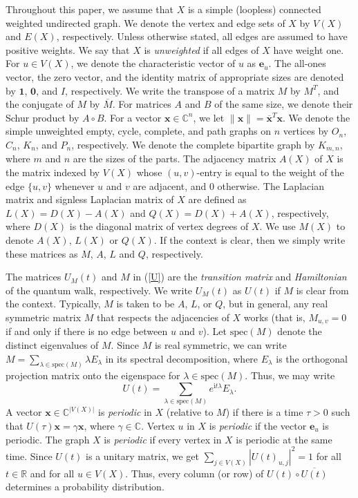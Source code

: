 \documentclass[11pt]{article}
\newcommand{\be}{\mathbf e}
\newcommand{\bx}{\mathbf x}
\newcommand{\one}{\mathbf 1}
\newcommand{\zero}{\mathbf 0}
\def\ii{\mathrm{i}}
\newcommand\spec{{\mathrm{spec}}}
\def\C{\mathbb{C}}
\def\R{\mathbb{R}}
\begin{document}
Throughout this paper, we assume that $X$ is a simple (loopless) connected weighted undirected graph. We denote the vertex and edge sets of $X$ by $V(X)$ and $E(X)$, respectively. Unless otherwise stated, all edges are assumed to have positive weights. We say that $X$ is \textit{unweighted} if all edges of $X$ have weight one. For $u\in V(X)$, we denote the characteristic vector of $u$ as $\be_u$. The all-ones vector, the zero vector, and the identity matrix of appropriate sizes are denoted by $\one$, $\zero$, and $I$, respectively. We write the transpose of a matrix $M$ by $M^T$, and the conjugate of $M$ by $\overline{M}$. For matrices $A$ and $B$ of the same size, we denote their Schur product by $A\circ B$. For a vector $\bx\in\C^n$, we let $\|\bx\|=\overline{\bx}^T\bx$. We denote the simple unweighted empty, cycle, complete, and path graphs on $n$ vertices by $O_n$, $C_n$, $K_n$, and $P_n$, respectively. We denote the complete bipartite graph by $K_{m,n}$, where $m$ and $n$ are the sizes of the parts. The adjacency matrix $A(X)$ of $X$ is the matrix indexed by $V(X)$ whose $(u,v)$-entry is equal to the weight of the edge $\{u,v\}$ whenever $u$ and $v$ are adjacent, and 0 otherwise. The Laplacian matrix  and signless Laplacian matrix of $X$ are defined as $L(X)=D(X)-A(X)$ and $Q(X)=D(X)+A(X)$, respectively, where $D(X)$ is the diagonal matrix of vertex degrees of $X$. We use $M(X)$ to denote $A(X)$, $L(X)$ or $Q(X)$. If the context is clear, then we simply write these matrices as $M$, $A$, $L$ and $Q$, respectively.

The matrices $U_M(t)$ and $M$ in (\ref{U}) are the \textit{transition matrix} and \textit{Hamiltonian} of the quantum walk, respectively. We write $U_M(t)$ as $U(t)$ if $M$ is clear from the context. Typically, $M$ is taken to be $A$, $L$, or $Q$, but in general, any real symmetric matrix $M$ that respects the adjacencies of $X$ works (that is, $M_{u,v}=0$ if and only if there is no edge between $u$ and $v$). Let $\spec(M)$ denote the distinct eigenvalues of $M$. Since $M$ is real symmetric, we can write $M=\sum_{\lambda\in\spec(M)}\lambda E_{\lambda}$ in its spectral decomposition,  where $E_{\lambda}$ is the orthogonal projection matrix onto the eigenspace for $\lambda\in\spec(M)$.
Thus, we may write
\begin{equation*}
U(t)=\sum_{\lambda\in\spec(M)}e^{\ii t\lambda}E_{\lambda}.
\end{equation*}
A vector $\bx\in\C^{|V(X)|}$ is \textit{periodic} in $X$ (relative to $M$) if there is a time $\tau>0$ such that $U(\tau)\bx=\gamma\bx$, where $\gamma\in\C$. Vertex $u$ in $X$ is \textit{periodic} if the vector $\be_u$ is periodic. The graph $X$ is \textit{periodic} if every vertex in $X$ is periodic at the same time. Since $U(t)$ is a unitary matrix, we get $\sum_{j\in V(X)}|U(t)_{u,j}|^2=1$ for all $t\in\R$ and for all $u\in V(X)$. Thus, every column (or row) of $U(t)\circ\overline{U(t)}$ determines a probability distribution. 
\end{document}
